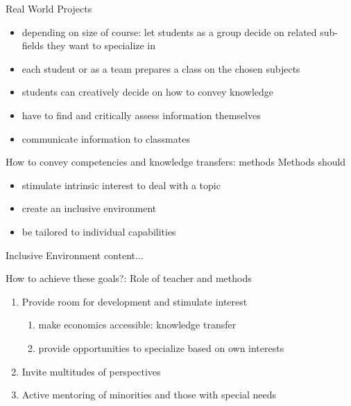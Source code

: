 \begin{frame}{Real World Projects}
	\begin{itemize}
		\item depending on size of course: let students as a \alert{group} decide on related sub-fields they want to specialize in 
		\item each student or as a team prepares a class on the chosen subjects
		\item students can \alert{creatively} decide on how to convey knowledge
		\item have to find and \alert{critically} assess information themselves
		\item \alert{communicate} information to classmates
	\end{itemize}
\end{frame}

\begin{frame}{How to convey competencies and knowledge transfers: methods}
	Methods should
	\begin{itemize}
		\item stimulate intrinsic interest to deal with a topic
		\item create an inclusive environment
		\item be tailored to individual capabilities
	\end{itemize}
\end{frame}


\begin{frame}{Inclusive Environment}
	content...
\end{frame}


\begin{frame}{How to achieve these goals?: {Role of teacher} and \alert{methods}}
	
	\begin{enumerate}
		\item Provide room for development and  stimulate interest
				\begin{enumerate}
					\item {make economics accessible: knowledge transfer} %
						\item {provide opportunities to specialize based on own interests}
					\end{enumerate}
		\item Invite multitudes of perspectives
		\item Active mentoring of minorities and those with special needs
	\end{enumerate}
\end{frame}


